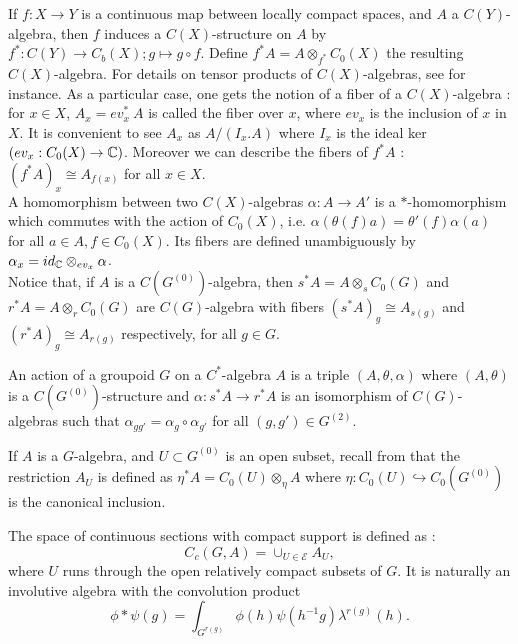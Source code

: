 If $f : X\rightarrow Y$ is a continuous map between locally compact spaces, and $A$ a $C(Y)$-algebra, then $f$ induces a $C(X)$-structure on $A$ by $f^* : C(Y) \rightarrow C_b(X); g\mapsto g\circ f$. Define $f^* A = A \otimes_{f^*} C_0(X)$ the resulting $C(X)$-algebra. For details on tensor products of $C(X)$-algebras, see \cite{LeGall} for instance. As a particular case, one gets the notion of a fiber of a $C(X)$-algebra : for $x\in X$, $A_x = ev_x^* \ A$ is called the fiber over $x$, where $ev_x$ is the inclusion of $x$ in $X$. It is convenient to see $A_x$ as $A/ (I_x .A)$ where $I_x$ is the ideal ker $(ev_x : C_0(X) \rightarrow \mathbb C)$. Moreover we can describe the fibers of $f^*A$ : $(f^*A)_x \cong A_{f(x)}$ for all $x\in X$.\\

A homomorphism between two $C(X)$-algebras $\alpha : A\rightarrow A'$ is a $*$-homomorphism which commutes with the action of $C_0(X)$, i.e. $\alpha(\theta(f)a)=\theta'(f)\alpha(a)$ for all $a\in A,f\in C_0(X)$. Its fibers are defined unambiguously by $\alpha_x = id_\mathbb C \otimes_{ev_x} \alpha$.\\

Notice that, if $A$ is a $C(G^{(0)})$-algebra, then $s^* A = A \otimes_s C_0(G)$ and $r^* A = A \otimes_r C_0(G)$ are $C(G)$-algebra with fibers $(s^*A)_g \cong A_{s(g)}$ and $(r^*A)_g \cong A_{r(g)}$ respectively, for all $g\in G$.

\begin{definition}
An action of a groupoid $G$ on a $C^*$-algebra $A$ is a triple $(A,\theta,\alpha)$ where $(A,\theta)$ is a $C(G^{(0)})$-structure and $\alpha : s^* A \rightarrow r^* A$ is an isomorphism of $C(G)$-algebras such that $\alpha_{gg'}= \alpha_g\circ \alpha_{g'}$ for all $(g,g')\in G^{(2)}$.
\end{definition} 

If $A$ is a $G$-algebra, and $U \subset G^{(0)}$ is an open subset, recall from \cite{LeGall} that the restriction $A_U$ is defined as $\eta^* A = C_0(U) \otimes_\eta A$ where $\eta : C_0(U) \hookrightarrow C_0(G^{(0)})$ is the canonical inclusion. 

The space of continuous sections with compact support is defined as :
\[C_c(G,A) = \cup_{U\in \mathcal E} A_U,\]
where $U$ runs through the open relatively compact subsets of $G$. It is naturally an involutive algebra with the convolution product
\[\phi\ast \psi (g) = \int_{G^{r(g)}} \phi(h)\psi(h^{-1}g)\lambda^{r(g)}(h).\] 

